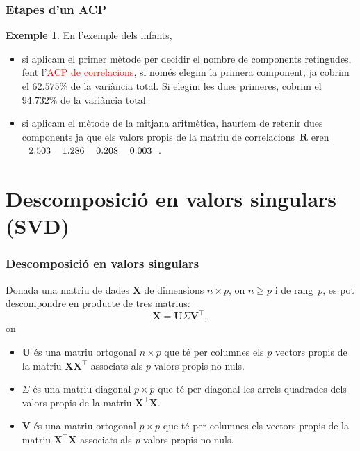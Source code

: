 \documentclass[12pt,t]{beamer}
\newcommand{\red}[1]{\textcolor{red}{#1}}
\renewcommand{\geq}{\geqslant}
\theoremstyle{plain}
\theoremstyle{definition}
\newtheorem{exemple}{Exemple}
\begin{document}
\begin{frame}
\frametitle{Etapes d'un ACP}
\begin{exemple}
En l'exemple dels infants,
\begin{itemize}
\item si aplicam el primer mètode per decidir el nombre de components retingudes, fent l'\red{ACP de correlacions}, si 
només elegim la primera component, ja cobrim el $62.575\%$ de la variància 
total. Si elegim les dues primeres, cobrim el $94.732\%$ de la 
variància total.
\item si aplicam el mètode de la mitjana aritmètica, hauríem de retenir dues components ja que  els valors propis de la 
matriu de correlacions~$\mathbf{R}$ eren 
$
\begin{tabular}{rrrr}
  2.503 & 1.286 & 0.208 & 0.003 \\ 
  \end{tabular}$.
\end{itemize}
\end{exemple}
\end{frame}


\section{Descomposició en valors singulars (SVD)}
\begin{frame}
\frametitle{Descomposició en valors singulars}
Donada una matriu de dades $\mathbf{X}$ de dimensions $n\times p$, on $n\geq p$ i de rang~$p$, es pot descompondre en 
producte de tres matrius:
\[
\mathbf{X}=\mathbf{U}\Sigma\mathbf{V}^\top,
\]
on
\begin{itemize}
\item $\mathbf{U}$ és una matriu ortogonal $n\times p$ que té per columnes els $p$ vectors propis de la matriu 
$\mathbf{X}\mathbf{X}^\top$ associats als $p$ valors propis no nuls.
\item ${\Sigma}$ és una matriu diagonal $p\times p$ que té per diagonal les arrels quadrades dels valors propis de la 
matriu $\mathbf{X}^\top\mathbf{X}$.
\item $\mathbf{V}$ és una matriu ortogonal $p\times p$ que té per columnes els vectors propis de la matriu 
$\mathbf{X}^\top\mathbf{X}$ associats als $p$ valors propis no nuls.
\end{itemize}
\end{frame}
\end{document}
